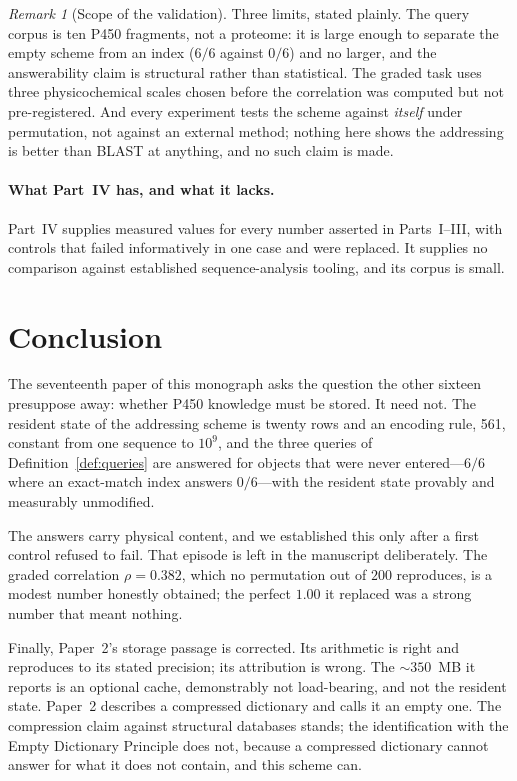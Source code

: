 \documentclass[11pt,twocolumn,a4paper]{article}
\theoremstyle{plain}
\theoremstyle{definition}
\theoremstyle{remark}
\newtheorem{remark}{Remark}
\begin{document}
\begin{remark}[Scope of the validation]
\label{rem:validation-scope}
Three limits, stated plainly. The query corpus is ten P450 fragments, not a
proteome: it is large enough to separate the empty scheme from an index
($6/6$ against $0/6$) and no larger, and the answerability claim is
structural rather than statistical. The graded task uses three
physicochemical scales chosen before the correlation was computed but not
pre-registered. And every experiment tests the scheme against \emph{itself}
under permutation, not against an external method; nothing here shows the
addressing is better than BLAST at anything, and no such claim is made.
\end{remark}

\paragraph{What Part~IV has, and what it lacks.}
Part~IV supplies measured values for every number asserted in Parts~I--III,
with controls that failed informatively in one case and were replaced. It
supplies no comparison against established sequence-analysis tooling, and
its corpus is small.

\section{Conclusion}

The seventeenth paper of this monograph asks the question the other sixteen
presuppose away: whether P450 knowledge must be stored. It need not. The
resident state of the addressing scheme is twenty rows and an encoding rule,
\SI{561}{\byte}, constant from one sequence to $10^{9}$, and the three
queries of Definition~\ref{def:queries} are answered for objects that were
never entered---$6/6$ where an exact-match index answers $0/6$---with the
resident state provably and measurably unmodified.

The answers carry physical content, and we established this only after a
first control refused to fail. That episode is left in the manuscript
deliberately. The graded correlation $\rho = 0.382$, which no permutation out
of $200$ reproduces, is a modest number honestly obtained; the perfect $1.00$
it replaced was a strong number that meant nothing.

Finally, Paper~2's storage passage is corrected. Its arithmetic is right and
reproduces to its stated precision; its attribution is wrong. The
${\sim}350$~MB it reports is an optional cache, demonstrably not
load-bearing, and not the resident state. Paper~2 describes a compressed
dictionary and calls it an empty one. The compression claim against
structural databases stands; the identification with the Empty Dictionary
Principle does not, because a compressed dictionary cannot answer for what
it does not contain, and this scheme can.



\end{document}

